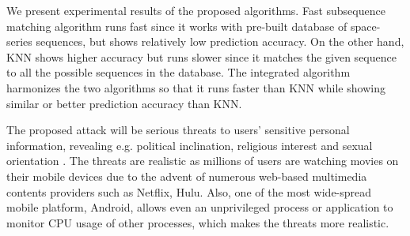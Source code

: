 We present experimental results of the proposed algorithms. Fast subsequence matching algorithm runs fast since it works with pre-built database of space-series sequences, but shows relatively low prediction accuracy.  On the other hand, KNN shows higher accuracy but runs slower since it matches the given sequence to all the possible sequences in the database.  The integrated algorithm harmonizes the two algorithms so that it runs faster than KNN while showing similar or better prediction accuracy than KNN. 

The proposed attack will be serious threats to users' sensitive personal information, revealing e.g. political inclination, religious interest and sexual orientation \cite{Frankowski:2006}\cite{chaabane:hal-00748162}. The threats are realistic as millions of users are watching movies on their mobile devices due to the advent of numerous web-based multimedia contents providers such as Netflix, Hulu. Also, one of the most wide-spread mobile platform, Android, allows even an unprivileged process or application to monitor CPU usage of other processes, which makes the threats more realistic. 